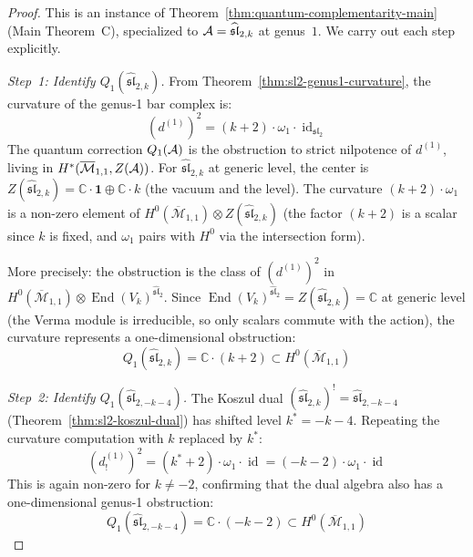 \begin{proof}
This is an instance of Theorem~\ref{thm:quantum-complementarity-main} (Main Theorem~C), specialized to $\mathcal{A} = \widehat{\mathfrak{sl}}_{2,k}$ at genus~$1$.  We carry out each step explicitly.

\emph{Step~1: Identify $Q_1(\widehat{\mathfrak{sl}}_{2,k})$.}
From Theorem~\ref{thm:sl2-genus1-curvature}, the curvature of the genus-1 bar complex is:
\begin{equation}
(d^{(1)})^2 = (k+2) \cdot \omega_1 \cdot \operatorname{id}_{\mathfrak{sl}_2}
\end{equation}
The quantum correction $Q_1(\mathcal{A})$ is the obstruction to strict nilpotence of $d^{(1)}$, living in $H^*(\overline{\mathcal{M}}_{1,1}, Z(\mathcal{A}))$.  For $\widehat{\mathfrak{sl}}_{2,k}$ at generic level, the center is $Z(\widehat{\mathfrak{sl}}_{2,k}) = \mathbb{C} \cdot \mathbf{1} \oplus \mathbb{C} \cdot k$ (the vacuum and the level).  The curvature $(k+2) \cdot \omega_1$ is a non-zero element of $H^0(\overline{\mathcal{M}}_{1,1}) \otimes Z(\widehat{\mathfrak{sl}}_{2,k})$ (the factor $(k+2)$ is a scalar since $k$ is fixed, and $\omega_1$ pairs with $H^0$ via the intersection form).

More precisely: the obstruction is the class of $(d^{(1)})^2$ in $H^0(\overline{\mathcal{M}}_{1,1}) \otimes \operatorname{End}(V_k)^{\widehat{\mathfrak{sl}}_2}$.  Since $\operatorname{End}(V_k)^{\widehat{\mathfrak{sl}}_2} = Z(\widehat{\mathfrak{sl}}_{2,k}) = \mathbb{C}$ at generic level (the Verma module is irreducible, so only scalars commute with the action), the curvature represents a one-dimensional obstruction:
\begin{equation}
Q_1(\widehat{\mathfrak{sl}}_{2,k}) = \mathbb{C} \cdot (k+2) \subset H^0(\overline{\mathcal{M}}_{1,1})
\end{equation}

\emph{Step~2: Identify $Q_1(\widehat{\mathfrak{sl}}_{2,-k-4})$.}
The Koszul dual $(\widehat{\mathfrak{sl}}_{2,k})^! = \widehat{\mathfrak{sl}}_{2,-k-4}$ (Theorem~\ref{thm:sl2-koszul-dual}) has shifted level $k^* = -k-4$.  Repeating the curvature computation with $k$ replaced by $k^*$:
\begin{equation}
(d^{(1)}_!)^2 = (k^* + 2) \cdot \omega_1 \cdot \operatorname{id} = (-k-2) \cdot \omega_1 \cdot \operatorname{id}
\end{equation}
This is again non-zero for $k \neq -2$, confirming that the dual algebra also has a one-dimensional genus-1 obstruction:
\begin{equation}
Q_1(\widehat{\mathfrak{sl}}_{2,-k-4}) = \mathbb{C} \cdot (-k-2) \subset H^0(\overline{\mathcal{M}}_{1,1})
\end{equation}


\end{proof}
